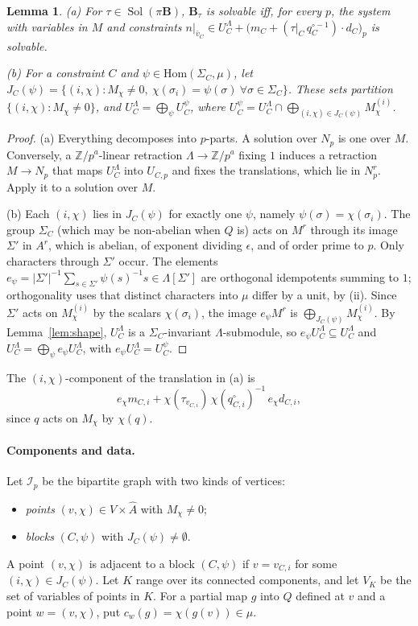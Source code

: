 \documentclass[11pt]{article}
\newtheorem{lemma}[theorem]{Lemma}
\theoremstyle{definition}
\theoremstyle{remark}
\newcommand{\Hom}{\mathrm{Hom}}
\newcommand{\Z}{\mathbb Z}
\newcommand{\Sol}{\operatorname{Sol}}
\newcommand{\Chars}{\widehat{A}}
\begin{document}
\begin{lemma}\label{lem:split}
(a) For $\tau\in\Sol(\pi\mathbf B)$, $\mathbf B_\tau$ is solvable iff, for every
$p$, the system with variables in $M$ and constraints $n|_{\bar v_C}\in
U_C^\Lambda+\big(m_C+(\tau|_C\,q_C^{\circ-1})\cdot d_C\big)_p$ is solvable.

(b) For a constraint $C$ and $\psi\in\Hom(\Sigma_C,\mu)$, let
$J_C(\psi)=\{(i,\chi): M_\chi\ne0,\ \chi(\sigma_i)=\psi(\sigma)\ \forall\sigma\in\Sigma_C\}$.
These sets partition $\{(i,\chi):M_\chi\ne0\}$, and $U_C^\Lambda=\bigoplus_\psi
U_C^\psi$, where $U_C^\psi=U_C^\Lambda\cap\bigoplus_{(i,\chi)\in
J_C(\psi)}M^{(i)}_\chi$.
\end{lemma}
\begin{proof}
(a) Everything decomposes into $p$-parts. A solution over $N_p$ is one over $M$.
Conversely, a $\Z/p^a$-linear retraction $\Lambda\to\Z/p^a$ fixing $1$ induces a
retraction $M\to N_p$ that maps $U_C^\Lambda$ into $U_{C,p}$ and fixes the
translations, which lie in $N_p^r$. Apply it to a solution over $M$.

(b) Each $(i,\chi)$ lies in $J_C(\psi)$ for exactly one $\psi$, namely
$\psi(\sigma)=\chi(\sigma_i)$. The group $\Sigma_C$ (which may be non-abelian
when $Q$ is) acts on $M^r$ through its image $\Sigma'$ in $A^r$, which is
abelian, of exponent dividing $\epsilon$, and of order prime to $p$. Only
characters through $\Sigma'$ occur. The elements
$e_\psi=|\Sigma'|^{-1}\sum_{s\in\Sigma'}\psi(s)^{-1}s\in\Lambda[\Sigma']$ are
orthogonal idempotents summing to $1$; orthogonality uses that distinct
characters into $\mu$ differ by a unit, by (ii). Since $\Sigma'$ acts on
$M^{(i)}_\chi$ by the scalars $\chi(\sigma_i)$, the image $e_\psi M^r$ is
$\bigoplus_{J_C(\psi)}M_\chi^{(i)}$. By Lemma~\ref{lem:shape}, $U_C^\Lambda$ is a
$\Sigma_C$-invariant $\Lambda$-submodule, so $e_\psi U_C^\Lambda\subseteq
U_C^\Lambda$ and $U_C^\Lambda=\bigoplus_\psi e_\psi U_C^\Lambda$, with $e_\psi
U_C^\Lambda=U_C^\psi$.
\end{proof}

The $(i,\chi)$-component of the translation in (a) is
\begin{equation}\label{eq:transl}
e_\chi m_{C,i}+\chi(\tau_{v_{C,i}})\,\chi(q^\circ_{C,i})^{-1}\,e_\chi d_{C,i},
\end{equation}
since $q$ acts on $M_\chi$ by $\chi(q)$.

\paragraph{Components and data.} Let $\mathcal I_p$ be the bipartite graph with
two kinds of vertices:
\begin{itemize}
\item \emph{points} $(v,\chi)\in V\times\Chars$ with $M_\chi\ne0$;
\item \emph{blocks} $(C,\psi)$ with $J_C(\psi)\neq\emptyset$.
\end{itemize}
A point $(v,\chi)$ is adjacent to a block $(C,\psi)$ if $v=v_{C,i}$ for some
$(i,\chi)\in J_C(\psi)$. Let $K$ range over its connected components, and let
$V_K$ be the set of variables of points in $K$. For a partial map $g$ into $Q$
defined at $v$ and a point $w=(v,\chi)$, put $c_w(g)=\chi(g(v))\in\mu$.
\end{document}
